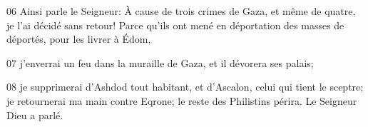 
06 Ainsi parle le Seigneur: À cause de trois crimes de Gaza, et même de quatre, je l’ai décidé sans retour! Parce qu’ils ont mené en déportation des masses de déportés, pour les livrer à Édom,

07 j’enverrai un feu dans la muraille de Gaza, et il dévorera ses palais;

08 je supprimerai d’Ashdod tout habitant, et d’Ascalon, celui qui tient le sceptre; je retournerai ma main contre Eqrone; le reste des Philistins périra. Le Seigneur Dieu a parlé.